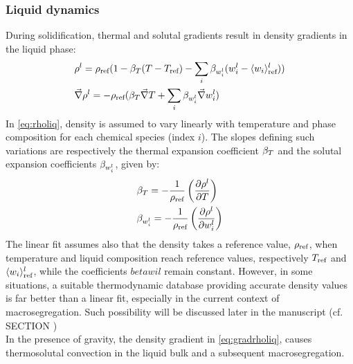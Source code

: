 \subsubsection*{Liquid dynamics}
During solidification, thermal and solutal gradients result in density gradients in the liquid phase: 
\begin{subequations}
\begin{align}
\label{eq:rholiq}
& \rho^l = \rho_{\text{ref}} ( 1 - \beta_T (T - T_{\text{ref}}) - \sum_{i} \beta_{w_i^l} (w_i^l - \langle w_i \rangle_{\text{ref}}^l) )  \\ 
\label{eq:gradrholiq}
& \vec{\nabla}\rho^l = -\rho_{\text{ref}} (  \beta_T \vec{\nabla} T + \sum_{i} \beta_{w_i^l} \vec{\nabla}w_i^l  )
\end{align}
\end{subequations}
%
In \cref{eq:rholiq}, density is assumed to vary linearly with temperature and phase composition 
for each chemical species (index $i$). The slopes defining such variations are respectively the 
thermal expansion coefficient $\beta_T$ and the solutal expansion coefficients $\beta_{w_i^l}$, given by:
%
\begin{subequations}
\begin{align}
\label{eq:betaT}
& \beta_T =  -\frac{1}{\rho_{\text{ref}}} \left( \frac{\partial\rho^l}{\partial T} \right)  \\ 
\label{eq:betawil}
& \beta_{w_i^l} = -\frac{1}{\rho_{\text{ref}}} \left( \frac{\partial \rho^l}{\partial w_i^l} \right)  
\end{align}
\end{subequations}
%
The linear fit assumes also that the density takes a reference value, $\rho_{\text{ref}}$, when temperature 
and liquid composition reach reference values, respectively $T_{\text{ref}}$ and $\langle w_i \rangle_{\text{ref}}^l$, while the
coefficients $betawil$ remain constant. However, in some 
situations, a suitable thermodynamic database providing accurate density values is far better than a 
linear fit, especially in the current context of macrosegregation. 
Such possibility will be discussed later in the manuscript (cf. SECTION )\\ %
In the presence of gravity, the density gradient in \cref{eq:gradrholiq}, causes thermosolutal convection 
in the liquid bulk and a subsequent macrosegregation.
%
% 
